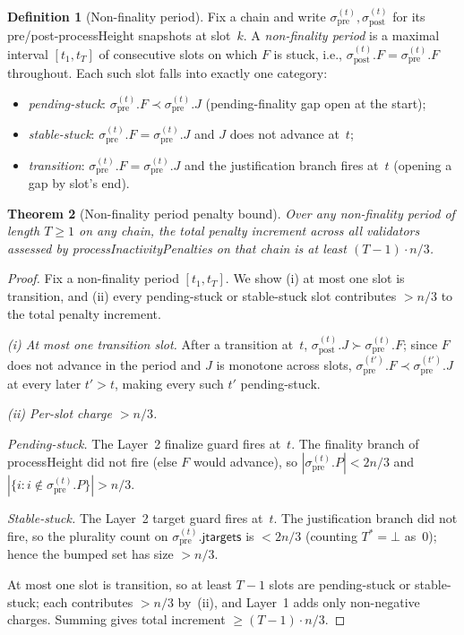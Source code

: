\documentclass{article}
\newcommand{\jtargets}{\mathsf{jtargets}}
\newcommand{\processHeight}{\textsf{processHeight}\xspace}
\newcommand{\processInactivityPenalties}{\textsf{processInactivityPenalties}\xspace}
\theoremstyle{plain}
\newtheorem{theorem}{Theorem}
\theoremstyle{definition}
\newtheorem{definition}[theorem]{Definition}
\theoremstyle{remark}
\begin{document}
\begin{definition}[Non-finality period]\label{def:non-finality-period}
Fix a chain and write $\sigma_{\mathrm{pre}}^{(t)}, \sigma_{\mathrm{post}}^{(t)}$ for its pre/post-\processHeight snapshots at slot~$k$.
A \emph{non-finality period} is a maximal interval $[t_1, t_T]$ of consecutive slots on which $F$ is stuck, i.e., $\sigma_{\mathrm{post}}^{(t)}.F = \sigma_{\mathrm{pre}}^{(t)}.F$ throughout.
Each such slot falls into exactly one category:
\begin{itemize}
  \item \emph{pending-stuck}: $\sigma_{\mathrm{pre}}^{(t)}.F \prec \sigma_{\mathrm{pre}}^{(t)}.J$ (pending-finality gap open at the start);
  \item \emph{stable-stuck}: $\sigma_{\mathrm{pre}}^{(t)}.F = \sigma_{\mathrm{pre}}^{(t)}.J$ and $J$ does not advance at~$t$;
  \item \emph{transition}: $\sigma_{\mathrm{pre}}^{(t)}.F = \sigma_{\mathrm{pre}}^{(t)}.J$ and the justification branch fires at~$t$ (opening a gap by slot's end).
\end{itemize}
\end{definition}

\begin{theorem}[Non-finality period penalty bound]\label{thm:tightness}
Over any non-finality period of length $T \geq 1$ on any chain, the total penalty increment across all validators assessed by \processInactivityPenalties on that chain is at least $(T - 1) \cdot n/3$.
\end{theorem}

\begin{proof}
Fix a non-finality period $[t_1, t_T]$.
We show (i) at most one slot is transition, and (ii) every pending-stuck or stable-stuck slot contributes $> n/3$ to the total penalty increment.

\emph{(i) At most one transition slot.}
After a transition at~$t$, $\sigma_{\mathrm{post}}^{(t)}.J \succ \sigma_{\mathrm{pre}}^{(t)}.F$; since $F$ does not advance in the period and $J$ is monotone across slots, $\sigma_{\mathrm{pre}}^{(t')}.F \prec \sigma_{\mathrm{pre}}^{(t')}.J$ at every later $t' > t$, making every such $t'$ pending-stuck.

\emph{(ii) Per-slot charge $> n/3$.}

\emph{Pending-stuck.} The Layer~2 finalize guard fires at~$t$.
The finality branch of \processHeight did not fire (else $F$ would advance), so $|\sigma_{\mathrm{pre}}^{(t)}.P| < 2n/3$ and $|\{i : i \notin \sigma_{\mathrm{pre}}^{(t)}.P\}| > n/3$.

\emph{Stable-stuck.} The Layer~2 target guard fires at~$t$.
The justification branch did not fire, so the plurality count on $\sigma_{\mathrm{pre}}^{(t)}.\jtargets$ is $< 2n/3$ (counting $T^* = \bot$ as~$0$); hence the bumped set has size $> n/3$.

At most one slot is transition, so at least $T - 1$ slots are pending-stuck or stable-stuck; each contributes $> n/3$ by~(ii), and Layer~1 adds only non-negative charges.
Summing gives total increment $\geq (T-1) \cdot n/3$.
\end{proof}
\end{document}
